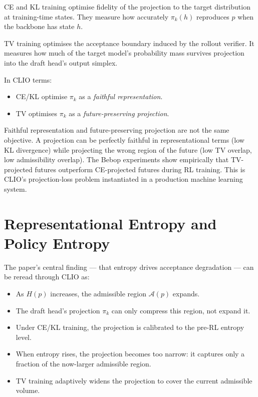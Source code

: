 \documentclass[11pt, a4paper, openany]{book}
\theoremstyle{plain}
\theoremstyle{definition}
\theoremstyle{remark}
\begin{document}
CE and KL training optimise fidelity of the projection to the target distribution
at training-time states.
They measure how accurately $\pi_k(h)$ reproduces $p$ when the backbone has
state $h$.

TV training optimises the acceptance boundary induced by the rollout verifier.
It measures how much of the target model's probability mass survives projection
into the draft head's output simplex.

In CLIO terms:
\begin{itemize}
  \item CE/KL optimise $\pi_k$ as a \emph{faithful representation}.
  \item TV optimises $\pi_k$ as a \emph{future-preserving projection}.
\end{itemize}

Faithful representation and future-preserving projection are not the same
objective.
A projection can be perfectly faithful in representational terms
(low KL divergence) while projecting the wrong region of the future
(low TV overlap, low admissibility overlap).
The Bebop experiments show empirically that TV-projected futures
outperform CE-projected futures during RL training.
This is CLIO's projection-loss problem instantiated in a production
machine learning system.

\section{Representational Entropy and Policy Entropy}

The paper's central finding --- that entropy drives acceptance degradation ---
can be reread through CLIO as:

\begin{itemize}
  \item As $H(p)$ increases, the admissible region $\mathcal{A}(p)$ expands.
  \item The draft head's projection $\pi_k$ can only compress this region,
    not expand it.
  \item Under CE/KL training, the projection is calibrated to the pre-RL
    entropy level.
  \item When entropy rises, the projection becomes too narrow: it captures
    only a fraction of the now-larger admissible region.
  \item TV training adaptively widens the projection to cover the current
    admissible volume.
\end{itemize}
\end{document}
